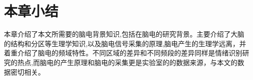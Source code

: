 \section{本章小结}

	本章介绍了本文所需要的脑电背景知识,包括在脑电的研究背景。主要介绍了大脑的结构和分区等生理学知识,以及脑电信号采集的原理,脑电产生的生理学远离，并着重介绍了脑电的频域特性。不同区域的差异和不同频段的差异同样是情绪识别研究的热点,而脑电的产生原理和脑电的采集更是实验室的的数据来源，与本文的数据密切相关。